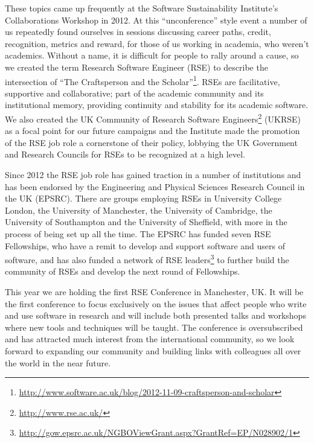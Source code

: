 \documentclass[a4paper,UKenglish]{dagrep}
\begin{document}
These topics came up frequently at the Software Sustainability Institute's Collaborations Workshop in 2012. At this ``unconference'' style event a number of us repeatedly found ourselves in sessions discussing career paths, credit, recognition, metrics and reward, for those of us working in academia, who weren't academics. Without a name, it is difficult for people to rally around a cause, so we created the term Research Software Engineer (RSE) to describe the intersection of ``The Craftsperson and the Scholar''\footnote{\url{http://www.software.ac.uk/blog/2012-11-09-craftsperson-and-scholar}}. RSEs are facilitative, supportive and collaborative; part of the academic community and its institutional memory, providing continuity and stability for its academic software. We also created the UK Community of Research Software Engineers\footnote{\url{http://www.rse.ac.uk/}} (UKRSE) as a focal point for our future campaigns and the Institute made the promotion of the RSE job role a cornerstone of their policy, lobbying the UK Government and Research Councils for RSEs to be recognized at a high level.

Since 2012 the RSE job role has gained traction in a number of institutions and has been endorsed by the Engineering and Physical Sciences Research Council in the UK (EPSRC). There are groups employing RSEs in University College London, the University of Manchester, the University of Cambridge, the University of Southampton and the University of Sheffield, with more in the process of being set up all the time. The EPSRC has funded seven RSE Fellowships, who have a remit to develop and support software and users of software, and has also funded a network of RSE leaders\footnote{\url{http://gow.epsrc.ac.uk/NGBOViewGrant.aspx?GrantRef=EP/N028902/1}} to further build the community of RSEs and develop the next round of Fellowships.

This year we are holding the first RSE Conference in Manchester, UK. It will be the first conference to focus exclusively on the issues that affect people who write and use software in research and will include both presented talks and workshops where new tools and techniques will be taught. The conference is oversubscribed and has attracted much interest from the international community, so we look forward to expanding our community and building links with colleagues all over the world in the near future.

\end{document}
